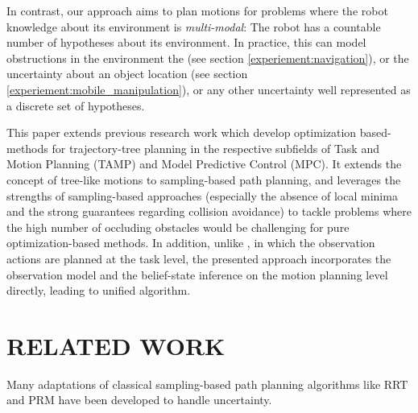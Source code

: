 \documentclass[letterpaper, 10 pt, conference]{ieeeconf}  %
\begin{document}
In contrast, our approach aims to plan motions for problems where the robot knowledge about its environment is \textit{multi-modal}: The robot has a countable number of hypotheses about its environment. In practice, this can model obstructions in the environment the (see section \ref{experiement:navigation}), or the uncertainty about an object location (see section \ref{experiement:mobile_manipulation}), or any other uncertainty well represented as a discrete set of hypotheses.

This paper extends previous research work \cite{tamp-1}\cite{control-tree-1} which develop optimization based-methods for trajectory-tree planning in the respective subfields of Task and Motion Planning (TAMP) and Model Predictive Control (MPC). It extends the concept of tree-like motions to sampling-based path planning, and leverages the strengths of sampling-based approaches (especially the absence of local minima and the strong guarantees regarding collision avoidance) to tackle problems where the high number of occluding obstacles would be challenging for pure optimization-based methods. %
In addition, unlike \cite{tamp-1}, in which the observation actions are planned at the task level, the presented approach incorporates the observation model and the belief-state inference on the motion planning level directly, leading to unified algorithm.



\section{RELATED WORK}
Many adaptations of classical sampling-based path planning algorithms like RRT \cite{lavalle1998rapidly} and PRM \cite{kavraki1996probabilistic} have been developed to handle uncertainty.
\end{document}
